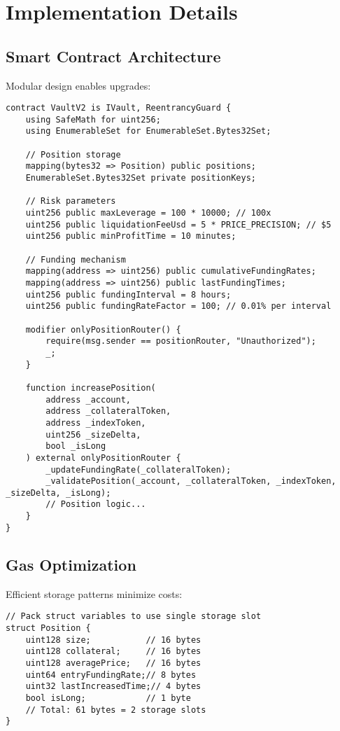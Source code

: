 \documentclass[11pt,a4paper]{article}
\begin{document}
\section{Implementation Details}

\subsection{Smart Contract Architecture}

Modular design enables upgrades:

\begin{lstlisting}[caption={Core Contract Structure}]
contract VaultV2 is IVault, ReentrancyGuard {
    using SafeMath for uint256;
    using EnumerableSet for EnumerableSet.Bytes32Set;

    // Position storage
    mapping(bytes32 => Position) public positions;
    EnumerableSet.Bytes32Set private positionKeys;

    // Risk parameters
    uint256 public maxLeverage = 100 * 10000; // 100x
    uint256 public liquidationFeeUsd = 5 * PRICE_PRECISION; // $5
    uint256 public minProfitTime = 10 minutes;

    // Funding mechanism
    mapping(address => uint256) public cumulativeFundingRates;
    mapping(address => uint256) public lastFundingTimes;
    uint256 public fundingInterval = 8 hours;
    uint256 public fundingRateFactor = 100; // 0.01% per interval

    modifier onlyPositionRouter() {
        require(msg.sender == positionRouter, "Unauthorized");
        _;
    }

    function increasePosition(
        address _account,
        address _collateralToken,
        address _indexToken,
        uint256 _sizeDelta,
        bool _isLong
    ) external onlyPositionRouter {
        _updateFundingRate(_collateralToken);
        _validatePosition(_account, _collateralToken, _indexToken, _sizeDelta, _isLong);
        // Position logic...
    }
}
\end{lstlisting}

\subsection{Gas Optimization}

Efficient storage patterns minimize costs:

\begin{lstlisting}[caption={Storage Optimization}]
// Pack struct variables to use single storage slot
struct Position {
    uint128 size;           // 16 bytes
    uint128 collateral;     // 16 bytes
    uint128 averagePrice;   // 16 bytes
    uint64 entryFundingRate;// 8 bytes
    uint32 lastIncreasedTime;// 4 bytes
    bool isLong;            // 1 byte
    // Total: 61 bytes = 2 storage slots
}
\end{lstlisting}
\end{document}
